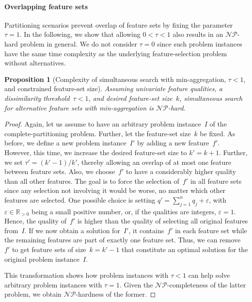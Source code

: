 \documentclass{article}
\newtheorem{proposition}{Proposition}
\theoremstyle{definition}
\begin{document}
\paragraph{Overlapping feature sets}

Partitioning scenarios prevent overlap of feature sets by fixing the parameter~$\tau = 1$.
In the following, we show that allowing $0 < \tau < 1$ also results in an $\mathcal{NP}$-hard problem in general.
We do not consider $\tau = 0$ since such problem instances have the same time complexity as the underlying feature-selection problem without alternatives.
%
\begin{proposition}[Complexity of simultaneous search with min-aggregation, $\tau < 1$, and constrained feature-set size]
	Assuming univariate feature qualities, a dissimilarity threshold~$\tau < 1$, and desired feature-set size~$k$, simultaneous search for alternative feature sets with min-aggregation is $\mathcal{NP}$-hard.
	\label{prop:afs:complexity-no-partitioning-min-constrained-k}
\end{proposition}
%
\begin{proof}
Again, let us assume to have an arbitrary problem instance~$I$ of the complete-partitioning problem.
Further, let the feature-set size~$k$ be fixed.
As before, we define a new problem instance~$I'$ by adding a new feature~$f'$.
However, this time, we increase the desired feature-set size to $k' = k + 1$.
Further, we set $\tau' = (k' - 1) / k'$, thereby allowing an overlap of at most one feature between feature sets.
Also, we choose~$f'$ to have a considerably higher quality than all other features.
The goal is to force the selection of~$f'$ in all feature sets since any selection not involving it would be worse, no matter which other features are selected.
One possible choice is setting $q' = \sum_{j=1}^n q_j + \varepsilon$, with $\varepsilon \in \mathbb{R}_{> 0}$ being a small positive number, or, if the qualities are integers, $\varepsilon = 1$.
Hence, the quality of~$f'$ is higher than the quality of selecting all original features from~$I$.
If we now obtain a solution for~$I'$, it contains~$f'$ in each feature set while the remaining features are part of exactly one feature set.
Thus, we can remove~$f'$ to get feature sets of size~$k = k' - 1$ that constitute an optimal solution for the original problem instance~$I$.

This transformation shows how problem instances with $\tau < 1$ can help solve arbitrary problem instances with $\tau = 1$.
Given the $\mathcal{NP}$-completeness of the latter problem, we obtain $\mathcal{NP}$-hardness of the former.
\end{proof}
\end{document}
